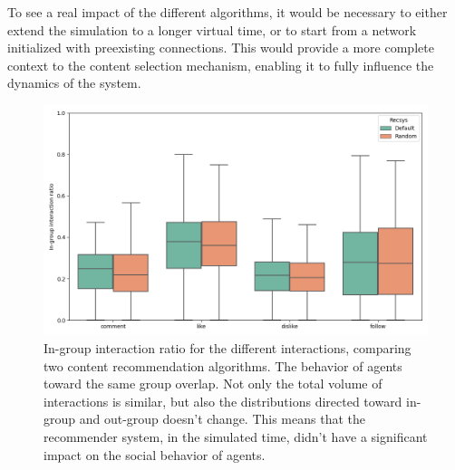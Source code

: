 To see a real impact of the different algorithms, it would be necessary to either extend the simulation to a longer virtual time, or to start from a network initialized with preexisting connections.
This would provide a more complete context to the content selection mechanism, enabling it to fully influence the dynamics of the system.



\begin{figure}[h]
    \centering
    \includegraphics[width=0.6\linewidth]{Images/RecSys/recsys_in_group_ratio.png}
    \caption{In-group interaction ratio for the different interactions, comparing two content recommendation algorithms.
    The behavior of agents toward the same group overlap.
    Not only the total volume of interactions is similar, but also the distributions directed toward in-group and out-group doesn't change.
    This means that the recommender system, in the simulated time, didn't have a significant impact on the social behavior of agents.}
    \label{fig:recsys_comparison}
\end{figure}